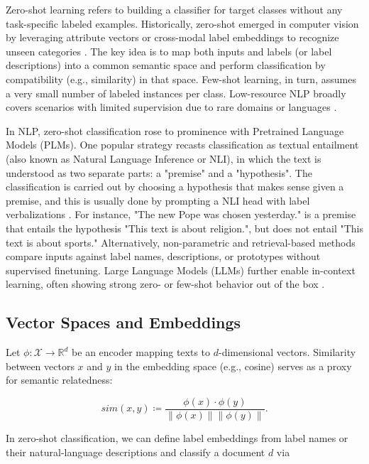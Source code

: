 \documentclass[]{politex-xico}
\begin{document}
Zero-shot learning refers to building a classifier for target classes without any task-specific labeled examples. Historically, zero-shot emerged in computer vision by leveraging attribute vectors or cross-modal label embeddings to recognize unseen categories \cite{socher2013zero,romera2015embarrassingly}. The key idea is to map both inputs and labels (or label descriptions) into a common semantic space and perform classification by compatibility (e.g., similarity) in that space. Few-shot learning, in turn, assumes a very small number of labeled instances per class. Low-resource NLP broadly covers scenarios with limited supervision due to rare domains or languages \cite{hedderich2020survey}.

In NLP, zero-shot classification rose to prominence with Pretrained Language Models (PLMs). One popular strategy recasts classification as textual entailment (also known as Natural Language Inference or NLI), in which the text is understood as two separate parts: a "premise" and a "hypothesis". The classification is carried out by choosing a hypothesis that makes sense given a premise, and this is usually done by prompting a NLI head with label verbalizations \cite{yin2019benchmarking,williams2018broad,BERT,liu2019roberta,conneau2018xnli}. For instance, "The new Pope was chosen yesterday." is a premise that entails the hypothesis "This text is about religion.", but does not entail "This text is about sports."  Alternatively, non-parametric and retrieval-based methods compare inputs against label names, descriptions, or prototypes without supervised finetuning. Large Language Models (LLMs) further enable in-context learning, often showing strong zero- or few-shot behavior out of the box \cite{brown2020language,chan2022data,liu2023summary}.

\subsection{Vector Spaces and Embeddings}
Let $\phi: \mathcal{X} \to \mathbb{R}^d$ be an encoder mapping texts to $d$-dimensional vectors. Similarity between vectors $x$ and $y$ in the embedding space (e.g., cosine) serves as a proxy for semantic relatedness:

\begin{equation}
    sim(x,y) \coloneqq
    \frac{\phi(x) \cdot \phi(y)}{\lVert \phi(x) \rVert  \lVert \phi(y) \rVert}.
\end{equation}
 

In zero-shot classification, we can define label embeddings from label names or their natural-language descriptions and classify a document $d$ via
\end{document}

